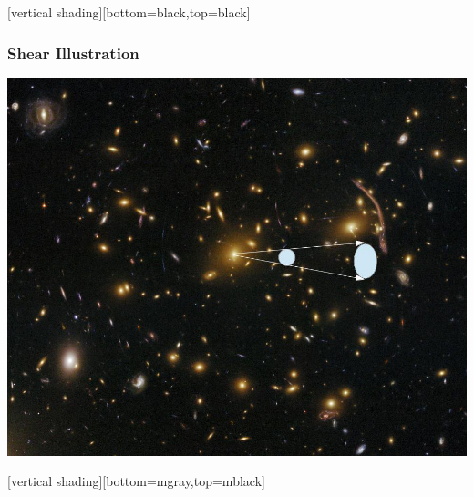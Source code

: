 \documentclass{beamer}
\begin{document}

{
    [vertical shading][bottom=black,top=black]
	
    \frame
    {
        \frametitle{Shear Illustration}
        \begin{center}
            \includegraphics[height=0.8\textheight]{shear-illustration-nowhite.jpg}
        \end{center}
    }

    [vertical shading][bottom=mgray,top=mblack]

}
\end{document}
